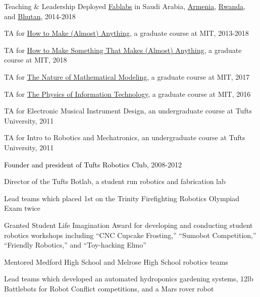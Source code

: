 \documentclass{resume} %
\begin{document}
\begin{rSection}{Teaching \& Leadership}
Deployed \href{http://www.fabfoundation.org/}{Fablabs} in Saudi Arabia, \href{https://foundation.ayb.am/en/bepart/first-two-fab-labs-in-armenia}{Armenia}, \href{https://www.engineersrule.com/fablab-network-spreads-rwanda-solidworks-support/}{Rwanda}, and \href{http://www.fablab.bt/}{Bhutan}, 2014-2018

TA for \href{http://fab.cba.mit.edu/classes/863.18/}{How to Make (Almost) Anything}, a graduate course at MIT, 2013-2018

TA for \href{http://fab.cba.mit.edu/classes/865.18/index.html}{How to Make Something That Makes (Almost) Anything}, a graduate course at MIT, 2018

TA for \href{http://fab.cba.mit.edu/classes/864.17/index.html}{The Nature of Mathematical Modeling}, a graduate course at MIT, 2017

TA for \href{http://fab.cba.mit.edu/classes/862.16/index.html}{The Physics of Information Technology}, a graduate course at MIT, 2016

TA for Electronic Musical Instrument Design, an undergraduate course at Tufts University, 2011

TA for Intro to Robotics and Mechatronics, an undergraduate course at Tufts University, 2011

{\textcolor{black}{Founder and president of Tufts Robotics Club}, 2008-2012}

\begingroup\leftskip=0.7cm
Director of the Tufts Botlab, a student run robotics and fabrication lab

Lead teams which placed 1st on the Trinity Firefighting Robotics Olympiad Exam twice

Granted Student Life Imagination Award for developing and conducting student robotics workshops including “CNC Cupcake Frosting,” “Sumobot Competition,” “Friendly Robotics,” and “Toy-hacking Elmo”

Mentored Medford High School and Melrose High School robotics teams

Lead teams which developed an automated hydroponics gardening systems, 12lb Battlebots for Robot Conflict competitions, and a Mars rover robot

\endgroup

\end{rSection}
\end{document}
